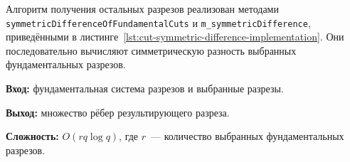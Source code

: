 Алгоритм получения остальных разрезов реализован методами \texttt{symmetric\allowbreak{}Difference\allowbreak{}Of\allowbreak{}Fundamental\allowbreak{}Cuts} и \texttt{m\_symmetric\allowbreak{}Difference}, приведёнными в листинге~\ref{lst:cut-symmetric-difference-implementation}. Они последовательно вычисляют симметрическую разность выбранных фундаментальных разрезов.

\textbf{Вход:} фундаментальная система разрезов и выбранные разрезы.

\textbf{Выход:} множество рёбер результирующего разреза.

\textbf{Сложность:} $O(rq\log q)$, где $r$~--- количество выбранных фундаментальных разрезов.

